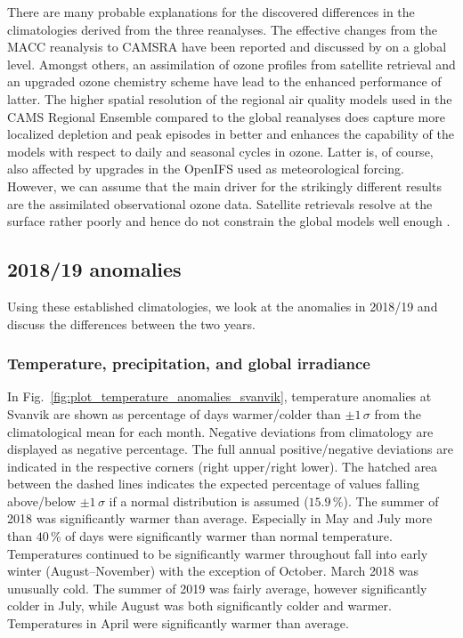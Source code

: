 \documentclass[bg, manuscript]{copernicus}
\begin{document}
There are many probable explanations for the discovered differences in the climatologies derived from the three reanalyses. The effective changes from the MACC reanalysis to CAMSRA have been reported and discussed by \citet{ACP:Inness2019} on a global level. Amongst others, an assimilation of ozone profiles from satellite retrieval and an upgraded ozone chemistry scheme have lead to the enhanced performance of latter. The higher spatial resolution of the regional air quality models used in the CAMS Regional Ensemble compared to the global reanalyses does capture more localized depletion and peak episodes in \chem{[O_3]} better and enhances the capability of the models with respect to daily and seasonal cycles in ozone. Latter is, of course, also affected by upgrades in the OpenIFS used as meteorological forcing. However, we can assume that the main driver for the strikingly different results are the assimilated observational ozone data. Satellite retrievals resolve \chem{[O_3]} at the surface rather poorly and hence do not constrain the global models well enough \citet{ACP:Andersson2017}.

\subsection{2018/19 anomalies}
\label{subsec:anomalies}
Using these established climatologies, we look at the anomalies in 2018/19 and discuss the differences between the two years. 

\subsubsection{Temperature, precipitation, and global irradiance}
\label{subsubsec:anomal_tpq}
In Fig.~\ref{fig:plot_temperature_anomalies_svanvik}, temperature anomalies at Svanvik are shown as percentage of days warmer/colder than $\pm 1\,\sigma$ from the climatological mean for each month. Negative deviations from climatology are displayed as negative percentage. The full annual positive/negative deviations are indicated in the respective corners (right upper/right lower). The hatched area between the dashed lines indicates the expected percentage of values falling above/below $\pm 1\,\sigma$ if a normal distribution is assumed ($15.9\,\unit{\%}$). The summer of 2018 was significantly warmer than average. Especially in May and July more than $40\,\unit{\%}$ of days were significantly warmer than normal temperature. Temperatures continued to be significantly warmer throughout fall into early winter (August--November) with the exception of October. March 2018 was unusually cold. The summer of 2019 was fairly average, however significantly colder in July, while August was both significantly colder and warmer. Temperatures in April were significantly warmer than average.
\end{document}
